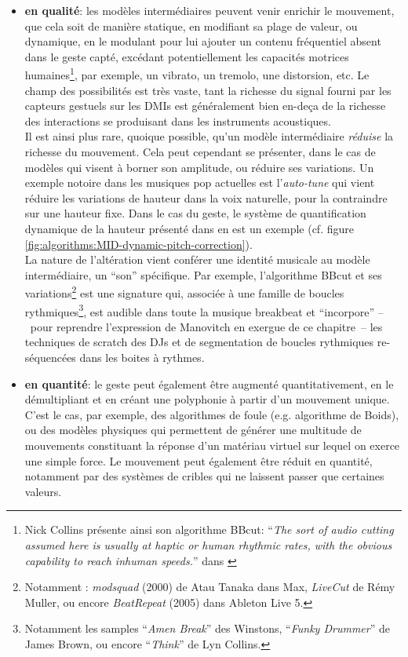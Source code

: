\begin{itemize}[noitemsep]
	\item \textbf{en qualité}: les modèles intermédiaires peuvent venir enrichir le mouvement, que cela soit de manière statique, en modifiant sa plage de valeur, ou dynamique, en le modulant pour lui ajouter un contenu fréquentiel absent dans le geste capté, excédant potentiellement les capacités motrices humaines\footnote{Nick Collins présente ainsi son algorithme BBcut: ``\textit{The sort of audio cutting assumed here is usually at haptic or human rhythmic rates, with the obvious capability to reach inhuman speeds.}'' dans \cite{collins_bbcut_2002}}, par exemple, un vibrato, un tremolo, une distorsion, etc. Le champ des possibilités est très vaste, tant la richesse du signal fourni par les capteurs gestuels sur les \glspl{DMI} est généralement bien en-deça de la richesse des interactions se produisant dans les instruments acoustiques.\\
	\indent Il est ainsi plus rare, quoique possible, qu'un modèle intermédiaire \textit{réduise} la richesse du mouvement. Cela peut cependant se présenter, dans le cas de modèles qui visent à borner son amplitude, ou réduire ses variations. Un exemple notoire dans les musiques pop actuelles est l'\textit{auto-tune} qui vient réduire les variations de hauteur dans la voix naturelle, pour la contraindre sur une hauteur fixe. Dans le cas du geste, le système de quantification dynamique de la hauteur présenté dans \cite{goudard_playing_2014} en est un exemple (cf. figure \ref{fig:algorithms:MID-dynamic-pitch-correction}).\\
	\indent La nature de l'altération vient conférer une identité musicale au modèle intermédiaire, un ``son'' spécifique. Par exemple, l'algorithme BBcut \cite{collins_bbcut_2002} et ses variations\footnote{Notamment : \textit{modsquad} (2000) de Atau Tanaka dans Max, \textit{LiveCut} de Rémy Muller, ou encore \textit{BeatRepeat} (2005) dans Ableton Live 5.} est une signature qui, associée à une famille de boucles rythmiques\footnote{Notamment les samples ``\textit{Amen Break}'' des Winstons, ``\textit{Funky Drummer}'' de James Brown, ou encore ``\textit{Think}'' de Lyn Collins.}, est audible dans toute la musique breakbeat et ``incorpore'' --~pour reprendre l'expression de Manovitch en exergue de ce chapitre~-- les techniques de scratch des DJs et de segmentation de boucles rythmiques re-séquencées dans les boites à rythmes.

	\item \textbf{en quantité}: le geste peut également être augmenté quantitativement, en le démultipliant et en créant une polyphonie à partir d'un mouvement unique. C'est le cas, par exemple, des algorithmes de foule (e.g. algorithme de Boids), ou des modèles physiques qui permettent de générer une multitude de mouvements constituant la réponse d'un matériau virtuel sur lequel on exerce une simple force. Le mouvement peut également être réduit en quantité, notamment par des systèmes de cribles qui ne laissent passer que certaines valeurs.
	

\end{itemize}
